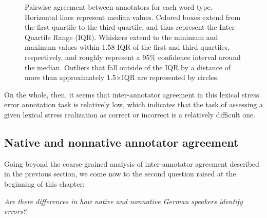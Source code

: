 \begin{figure}[phtb]
			\caption[Pairwise agreement statistics by word type]{Pairwise agreement between annotators for each word type. 	
			Horizontal lines represent median values. Colored boxes extend from the first quartile to the third quartile, and thus represent the Inter Quartile Range (IQR). Whiskers extend to the minimum and maximum values within 1.58 IQR of the first and third quartiles, respectively, and roughly represent a 95\% confidence interval around the median. 
			 Outliers that fall outside of the IQR by a distance of more than approximately 1.5$\times$IQR  are represented by circles.
			}
			\label{fig:agreement:words}
		\end{figure}
		
		
	
		
		 On the whole, then, it seems that inter-annotator agreement in this lexical stress error annotation task is relatively low, which indicates that the task of assessing a given lexical stress realization as correct or incorrect is a relatively difficult one. 
	
	
		\subsection{Native and nonnative annotator agreement}
		\label{sec:agreement:native}

		
		
		Going beyond the coarse-grained analysis of inter-annotator agreement described in the previous section, we come now to the second question raised at the beginning of this chapter:
		
		\textit{Are there differences in how native and nonnative German speakers identify errors?}
		
		
